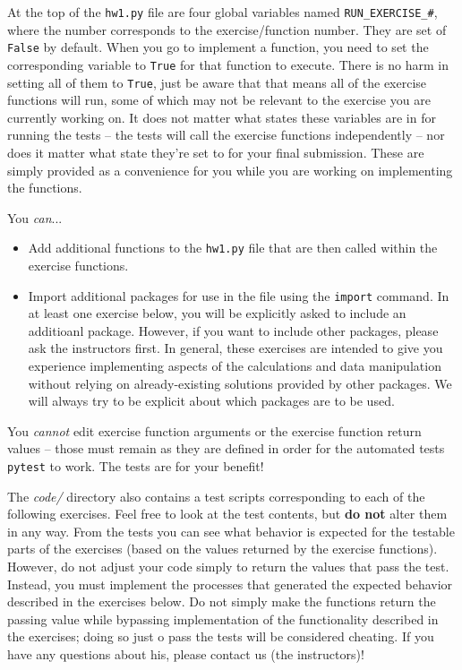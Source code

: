 \documentclass[10pt]{article}
\begin{document}
\begin{enumerate}
At the top of the {\tt hw1.py} file are four global variables named {\tt RUN\_EXERCISE\_\#}, where the number corresponds to the exercise/function number. They are set of {\tt False} by default. When you go to implement a function, you need to set the corresponding variable to {\tt True} for that function to execute. There is no harm in setting all of them to {\tt True}, just be aware that that means all of the exercise functions will run, some of which may not be relevant to the exercise you are currently working on. It does not matter what states these variables are in for running the tests -- the tests will call the exercise functions independently -- nor does it matter what state they're set to for your final submission. These are simply provided as a convenience for you while you are working on implementing the functions.

You {\em can}...
\begin{itemize}
\item Add additional functions to the {\tt hw1.py} file that are then called within the exercise functions. 
\item Import additional packages for use in the file using the {\tt import} command. In at least one exercise below, you will be explicitly asked to include an additioanl package. However, if you want to include other packages, please ask the instructors first. In general, these exercises are intended to give you experience implementing aspects of the calculations and data manipulation without relying on already-existing solutions provided by other packages. We will always try to be explicit about which packages are to be used.
\end{itemize}

You {\em cannot} edit exercise function arguments or the exercise function return values -- those must remain as they are defined in order for the automated tests {\tt pytest} to work. The tests are for your benefit!

The {\em code/} directory also contains a test scripts corresponding to each of the following exercises. Feel free to look at the test contents, but {\bf do not} alter them in any way. From the tests you can see what behavior is expected for the testable parts of the exercises (based on the values returned by the exercise functions). However, do not adjust your code simply to return the values that pass the test. Instead, you must implement the processes that generated the expected behavior described in the exercises below. Do not simply make the functions return the passing value while bypassing implementation of the functionality described in the exercises; doing so just o pass the tests will be considered cheating. If you have any questions about his, please contact us (the instructors)!


\end{enumerate}
\end{document}
